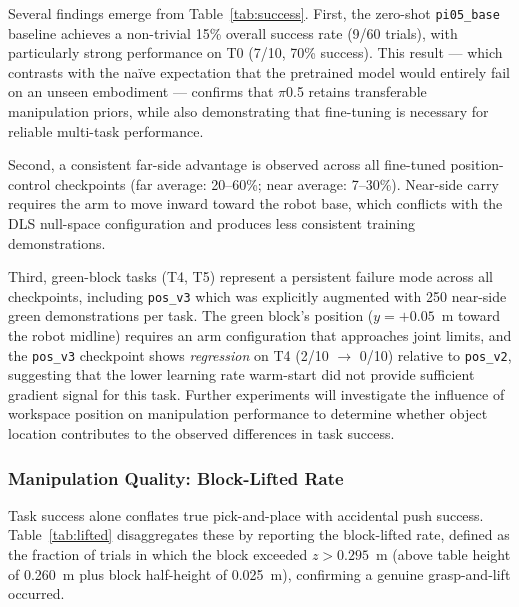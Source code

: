 \documentclass[conference, 12pt]{IEEEtran}
\begin{document}
Several findings emerge from Table~\ref{tab:success}.
First, the zero-shot \texttt{pi05\_base} baseline achieves a non-trivial 15\%
overall success rate (9/60 trials), with particularly strong performance on T0
(7/10, 70\% success).
This result --- which contrasts with the na\"{i}ve expectation that the pretrained
model would entirely fail on an unseen embodiment --- confirms that $\pi$0.5 retains
transferable manipulation priors, while also demonstrating that fine-tuning is
necessary for reliable multi-task performance.

Second, a consistent far-side advantage is observed across all fine-tuned
position-control checkpoints (far average: 20--60\%; near average: 7--30\%).
Near-side carry requires the arm to move inward toward the robot base, which
conflicts with the DLS null-space configuration and produces less consistent
training demonstrations.

Third, green-block tasks (T4, T5) represent a persistent failure mode across
all checkpoints, including \texttt{pos\_v3} which was explicitly augmented with
250 near-side green demonstrations per task.
The green block's position ($y = +0.05$~m toward the robot midline) requires
an arm configuration that approaches joint limits, and the \texttt{pos\_v3}
checkpoint shows \emph{regression} on T4 (2/10 $\to$ 0/10) relative to
\texttt{pos\_v2}, suggesting that the lower learning rate warm-start did not
provide sufficient gradient signal for this task. Further experiments will investigate the influence of workspace position on manipulation performance to determine whether object location contributes to the observed differences in task success.

\subsubsection{Manipulation Quality: Block-Lifted Rate}

Task success alone conflates true pick-and-place with accidental push success.
Table~\ref{tab:lifted} disaggregates these by reporting the block-lifted rate,
defined as the fraction of trials in which the block exceeded $z > 0.295$~m
(above table height of 0.260~m plus block half-height of 0.025~m),
confirming a genuine grasp-and-lift occurred.
\end{document}
